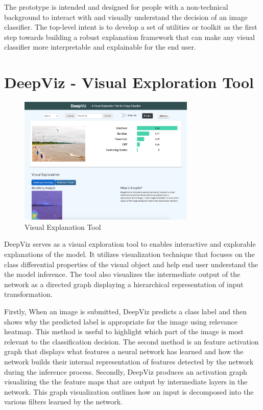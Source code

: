 The prototype is intended and designed for people with a non-technical background to interact with and visually understand the decision of an image classifier. The top-level intent is to develop a set of utilities or toolkit as the first step towards building a robust explanation framework that can make any visual classifier more interpretable and explainable for the end user.


\section{DeepViz - Visual Exploration Tool}

\begin{figure}[htbp]
\centering
\includegraphics[width=0.75\textwidth]{images/DeepViz001.png}
\caption{Visual Explanation Tool}
\label{fig:DeepViz - Visual Explanation Tool}
\end{figure}

DeepViz serves as a visual exploration tool to enables interactive and explorable explanations of the model. It utilizes visualization technique that focuses on the class differential properties of the visual object and help end user understand the the model inference. The tool also visualizes the intermediate output of the network as a directed graph displaying a hierarchical representation of input transformation.

Firstly, When an image is submitted, DeepViz predicts a class label and then shows why the predicted label is appropriate for the image using relevance heatmap. This method is useful to highlight which part of the image is most relevant to the classification decision. The second method is an feature activation graph that displays what features a neural network has learned and how the network builds their internal representation of  features detected by the network during the inference process. Secondly, DeepViz produces an activation graph visualizing the the feature maps that are output by intermediate layers in the network. This graph visualization outlines how an input is decomposed into the various filters learned by the network.


